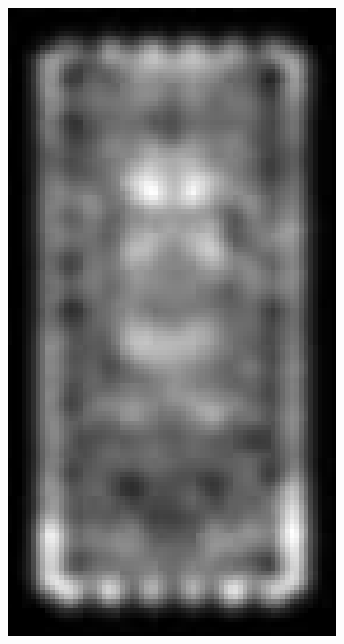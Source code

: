 \documentclass[thesis.tex]{subfiles}
\begin{document}
\begin{figure}
	\begin{subfigure}[t]{0.135\textwidth}
		\includegraphics[width=\textwidth]{img/inriaExampleDescriptorSvmMin.pdf}
		\caption{}
		\vspace{2mm}
	\end{subfigure}
	\begin{subfigure}[t]{0.135\textwidth}

\end{subfigure}
\end{figure}
\end{document}
